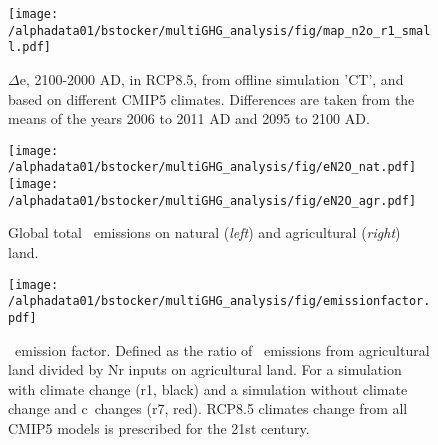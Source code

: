 \begin{figure}[ht!]
\begin{center}
  \texttt{[image: /alphadata01/bstocker/multiGHG\_analysis/fig/map\_n2o\_r1\_small.pdf]}
\end{center}
\caption[Maps of future \nno\ emission change for different climate change patterns (RCP8.5)]{$\Delta$e\nno [gN$_2$O-N/m$^2$/yr], 2100-2000 AD, in RCP8.5, from offline simulation 'CT', and based on different CMIP5 climates. Differences are taken from the means of the years 2006 to 2011 AD and 2095 to 2100 AD.}
\label{fig:mapN2O}
\end{figure}

\begin{figure}[ht!]
\begin{center}
\texttt{[image: /alphadata01/bstocker/multiGHG\_analysis/fig/eN2O\_nat.pdf]}
\texttt{[image: /alphadata01/bstocker/multiGHG\_analysis/fig/eN2O\_agr.pdf]}
\end{center}
\caption[Global total \nno\ emissions on natural and agricultural land.]{Global total \nno\ emissions on natural ({\sl left}) and agricultural ({\sl right}) land.}
\label{fig:eN2Oagrnat}
\end{figure}

\begin{figure}[ht!]
\begin{center}
\texttt{[image: /alphadata01/bstocker/multiGHG\_analysis/fig/emissionfactor.pdf]}
\end{center}
\caption[Future \nno\ emission factor over time (RCP8.5)]{\nno\ emission factor. Defined as the ratio of \nno\ emissions from agricultural land divided by Nr inputs on agricultural land. For a simulation with climate change (r1, black) and a simulation without climate change and c\coo\ changes (r7, red). RCP8.5 climates change from all CMIP5 models is prescribed for the 21st century.}
\label{fig:emissionfactor}
\end{figure}

